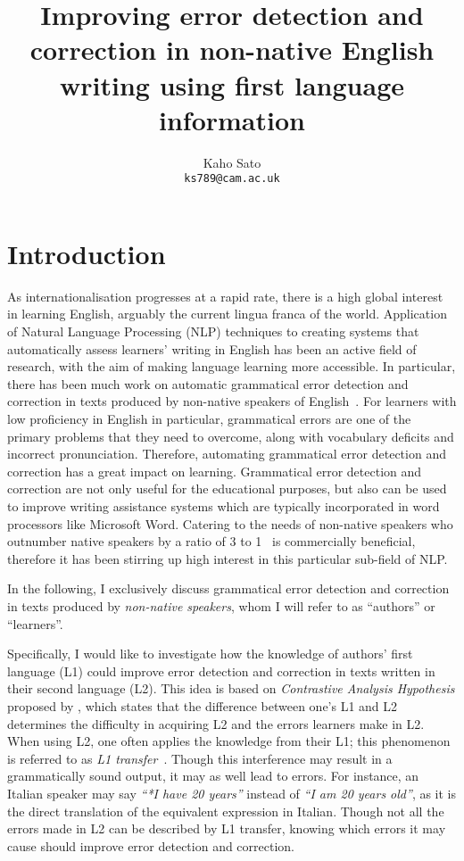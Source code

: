 \documentclass[11pt]{article}
\title{Improving error detection and correction in non-native English writing using first language information}
\author{
 Kaho Sato\\
  \texttt{ks789@cam.ac.uk}
}
\begin{document}
\maketitle

\section{Introduction}
As internationalisation progresses at a rapid rate, there is a high global 
interest in learning English, arguably the current lingua franca of the world. 
Application of Natural Language Processing (NLP) techniques to creating systems 
that automatically assess learners' writing in English has been an active field 
of research, with the aim of making language learning more accessible. In 
particular, there has been much work on automatic grammatical error detection 
and correction in texts produced by non-native speakers of 
English~\citep{izumi2003automatic, eeg2003automatic, han2006detecting, 
tetreault2008ups, de2008classifier, gamon2008using, gamon2010using, 
ng2014conll}.
For learners with low proficiency in English in particular, 
grammatical errors are one of the primary problems that they need to overcome,
along with vocabulary deficits and incorrect pronunciation. 
Therefore, automating grammatical error detection and correction has a great 
impact on learning. Grammatical error detection and correction are not only 
useful for the educational purposes, but also can be used to improve writing 
assistance systems which are typically incorporated in word processors like 
Microsoft Word. Catering to the needs of non-native speakers who outnumber native speakers by a ratio of 3 to 1~\citep{sussex1999david} is commercially 
beneficial, therefore it has been stirring up high interest in this particular 
sub-field of NLP.

In the following, I exclusively discuss grammatical error 
detection and correction in texts produced by \emph{non-native speakers}, whom I will refer to as ``authors'' or ``learners''.

\color{black}Specifically, I would like to investigate how the knowledge of authors' first 
language (L1) could improve error detection and correction in texts 
written in their second language (L2). This idea is based on \emph{Contrastive 
Analysis Hypothesis} proposed by \cite{lado1957linguistics}, which states that 
the difference between one's L1 and L2 determines the difficulty in acquiring L2 and the errors learners make in L2. 
When using L2, one often applies the knowledge from their L1; this phenomenon is referred to as {\em L1 transfer}~\citep{wanner1982language, frenck1997syntactic, 
dussias2003syntactic, nitschke2010first}. Though this interference may result in 
a grammatically sound output, it may as well lead to errors. For instance, an 
Italian speaker may say {\em ``*I have 20 years''} instead of {\em ``I am 20 years old''}, 
as it is the direct translation of the equivalent expression in Italian. Though 
not all the errors made in L2 can be described by L1 transfer, knowing which 
errors it may cause should improve error detection and correction.
\end{document}
